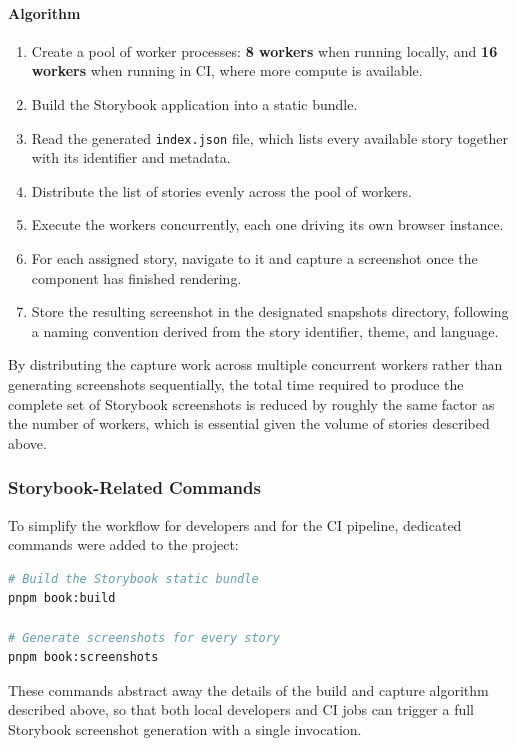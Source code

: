 \paragraph{Algorithm}

\begin{enumerate}
    \item Create a pool of worker processes: \textbf{8 workers} when running locally, and \textbf{16 workers} when running in \ac{CI}, where more compute is available.
    \item Build the Storybook application into a static bundle.
    \item Read the generated \texttt{index.json} file, which lists every available story together with its identifier and metadata.
    \item Distribute the list of stories evenly across the pool of workers.
    \item Execute the workers concurrently, each one driving its own browser instance.
    \item For each assigned story, navigate to it and capture a screenshot once the component has finished rendering.
    \item Store the resulting screenshot in the designated snapshots directory, following a naming convention derived from the story identifier, theme, and language.
\end{enumerate}

By distributing the capture work across multiple concurrent workers rather than generating screenshots sequentially, the total time required to produce the complete set of Storybook screenshots is reduced by roughly the same factor as the number of workers, which is essential given the volume of stories described above.

\subsubsection{Storybook-Related Commands}

To simplify the workflow for developers and for the \ac{CI} pipeline, dedicated commands were added to the project:

\begin{lstlisting}[language=bash]
# Build the Storybook static bundle
pnpm book:build

# Generate screenshots for every story
pnpm book:screenshots
\end{lstlisting}

These commands abstract away the details of the build and capture algorithm described above, so that both local developers and \ac{CI} jobs can trigger a full Storybook screenshot generation with a single invocation.

